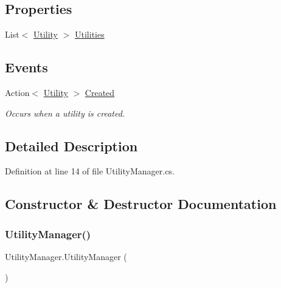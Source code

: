 \subsection*{Properties}
\begin{DoxyCompactItemize}
\item 
List$<$ \hyperlink{class_utility}{Utility} $>$ \hyperlink{class_utility_manager_af4625dbf9e27a0eb4a3e7b30b40e450a}{Utilities}
\end{DoxyCompactItemize}
\subsection*{Events}
\begin{DoxyCompactItemize}
\item 
Action$<$ \hyperlink{class_utility}{Utility} $>$ \hyperlink{class_utility_manager_a7f706d46fe0abd5992aac32fc2fd80e2}{Created}
\begin{DoxyCompactList}\small\item\em Occurs when a utility is created. \end{DoxyCompactList}\end{DoxyCompactItemize}


\subsection{Detailed Description}


Definition at line 14 of file Utility\+Manager.\+cs.



\subsection{Constructor \& Destructor Documentation}
\mbox{\label{class_utility_manager_a4ee75d8bf97b9cdda04c8f6b5df9f55d}} 
\subsubsection{\texorpdfstring{Utility\+Manager()}{UtilityManager()}}
{\footnotesize\ttfamily Utility\+Manager.\+Utility\+Manager (\begin{DoxyParamCaption}{ }\end{DoxyParamCaption})}



